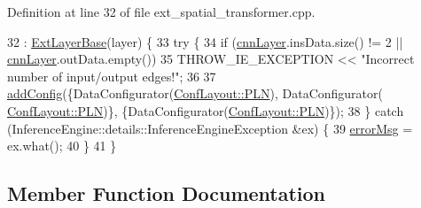 Definition at line 32 of file ext\+\_\+spatial\+\_\+transformer.\+cpp.


\begin{DoxyCode}
32                                                           : \hyperlink{classInferenceEngine_1_1Extensions_1_1Cpu_1_1ExtLayerBase_affff0e8263ca26852ccf71d299d7b06a}{ExtLayerBase}(layer) \{
33         \textcolor{keywordflow}{try} \{
34             \textcolor{keywordflow}{if} (\hyperlink{classInferenceEngine_1_1Extensions_1_1Cpu_1_1ExtLayerBase_a1074cdccacb9e9ca6eec01bbc2f7ca4a}{cnnLayer}.insData.size() != 2 || \hyperlink{classInferenceEngine_1_1Extensions_1_1Cpu_1_1ExtLayerBase_a1074cdccacb9e9ca6eec01bbc2f7ca4a}{cnnLayer}.outData.empty())
35                 THROW\_IE\_EXCEPTION << \textcolor{stringliteral}{"Incorrect number of input/output edges!"};
36 
37             \hyperlink{classInferenceEngine_1_1Extensions_1_1Cpu_1_1ExtLayerBase_a0ac7a6632e95b9500d5246b05b4b0bfa}{addConfig}(\{DataConfigurator(\hyperlink{classInferenceEngine_1_1Extensions_1_1Cpu_1_1ExtLayerBase_a1258a8d209e0249e0b1717618352ddfba446687ea2db1ada75be5ed053be77f59}{ConfLayout::PLN}), DataConfigurator(
      \hyperlink{classInferenceEngine_1_1Extensions_1_1Cpu_1_1ExtLayerBase_a1258a8d209e0249e0b1717618352ddfba446687ea2db1ada75be5ed053be77f59}{ConfLayout::PLN})\}, \{DataConfigurator(\hyperlink{classInferenceEngine_1_1Extensions_1_1Cpu_1_1ExtLayerBase_a1258a8d209e0249e0b1717618352ddfba446687ea2db1ada75be5ed053be77f59}{ConfLayout::PLN})\});
38         \} \textcolor{keywordflow}{catch} (InferenceEngine::details::InferenceEngineException &ex) \{
39             \hyperlink{classInferenceEngine_1_1Extensions_1_1Cpu_1_1ExtLayerBase_abc78e9b5a79fa339ffd831a5318f71f7}{errorMsg} = ex.what();
40         \}
41     \}
\end{DoxyCode}


\subsection{Member Function Documentation}
